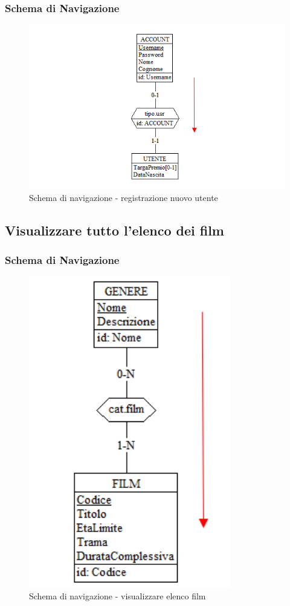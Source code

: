 \documentclass[a4paper,12pt]{report}
\begin{document}
	\subsubsection{Schema di Navigazione}
	\begin{figure}[H]
		\centering
		\includegraphics[width=450pt]{ER/navigazione/registrazioneutente.png}
		\caption{Schema di navigazione - registrazione nuovo utente}
	\end{figure}
	
	
	\subsection{Visualizzare tutto l'elenco dei film}
	\subsubsection{Schema di Navigazione}
	\begin{figure}[H]
		\centering
		\includegraphics[width=250pt]{ER/navigazione/visualizzarefilm.png}
		\caption{Schema di navigazione - visualizzare elenco film}
	\end{figure}
\end{document}
